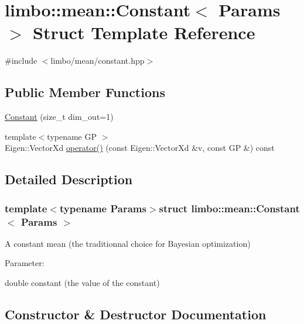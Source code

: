 \hypertarget{structlimbo_1_1mean_1_1_constant}{}\section{limbo\+:\+:mean\+:\+:Constant$<$ Params $>$ Struct Template Reference}
\label{structlimbo_1_1mean_1_1_constant}


{\ttfamily \#include $<$limbo/mean/constant.\+hpp$>$}

\subsection*{Public Member Functions}
\begin{DoxyCompactItemize}
\item 
\hyperlink{structlimbo_1_1mean_1_1_constant_a263296f6d6b10aa360727137588735f7}{Constant} (size\+\_\+t dim\+\_\+out=1)
\item 
{\footnotesize template$<$typename G\+P $>$ }\\Eigen\+::\+Vector\+Xd \hyperlink{structlimbo_1_1mean_1_1_constant_a6ea7d6a07dfb9a45cefe9717dd25030b}{operator()} (const Eigen\+::\+Vector\+Xd \&v, const G\+P \&) const 
\end{DoxyCompactItemize}


\subsection{Detailed Description}
\subsubsection*{template$<$typename Params$>$struct limbo\+::mean\+::\+Constant$<$ Params $>$}

A constant mean (the traditionnal choice for Bayesian optimization)

Parameter\+:
\begin{DoxyItemize}
\item {\ttfamily double constant} (the value of the constant) 
\end{DoxyItemize}

\subsection{Constructor \& Destructor Documentation}
\hypertarget{structlimbo_1_1mean_1_1_constant_a263296f6d6b10aa360727137588735f7}{}
